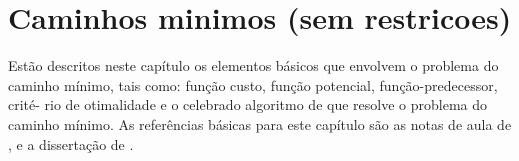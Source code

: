 \chapter{Caminhos minimos (sem restricoes)}
\label{cap:spp}

Estão descritos neste capítulo os elementos básicos que envolvem o 
problema do caminho mínimo, tais como: função custo, função potencial, 
função-predecessor, crité- rio de otimalidade e o celebrado algoritmo de 
\citet{dijkstra:56} que resolve o problema do caminho mínimo. As 
referências básicas para este capítulo são as notas de aula de 
\citet{paulo:97}, \citet{fabio:09}  e a dissertação de 
\citet{shigueo:02}.  

